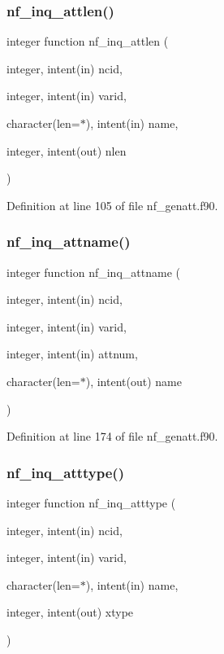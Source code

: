 \subsubsection{\texorpdfstring{nf\+\_\+inq\+\_\+attlen()}{nf\_inq\_attlen()}}
{\footnotesize\ttfamily integer function nf\+\_\+inq\+\_\+attlen (\begin{DoxyParamCaption}\item[{integer, intent(in)}]{ncid,  }\item[{integer, intent(in)}]{varid,  }\item[{character(len=$\ast$), intent(in)}]{name,  }\item[{integer, intent(out)}]{nlen }\end{DoxyParamCaption})}



Definition at line 105 of file nf\+\_\+genatt.\+f90.

\mbox{\label{nf__genatt_8f90_a87370c5fa098aaf289f0983582387921}} 
\subsubsection{\texorpdfstring{nf\+\_\+inq\+\_\+attname()}{nf\_inq\_attname()}}
{\footnotesize\ttfamily integer function nf\+\_\+inq\+\_\+attname (\begin{DoxyParamCaption}\item[{integer, intent(in)}]{ncid,  }\item[{integer, intent(in)}]{varid,  }\item[{integer, intent(in)}]{attnum,  }\item[{character(len=$\ast$), intent(out)}]{name }\end{DoxyParamCaption})}



Definition at line 174 of file nf\+\_\+genatt.\+f90.

\mbox{\label{nf__genatt_8f90_a91f4e37ce5ca9dd36e6d04e3c97ea245}} 
\subsubsection{\texorpdfstring{nf\+\_\+inq\+\_\+atttype()}{nf\_inq\_atttype()}}
{\footnotesize\ttfamily integer function nf\+\_\+inq\+\_\+atttype (\begin{DoxyParamCaption}\item[{integer, intent(in)}]{ncid,  }\item[{integer, intent(in)}]{varid,  }\item[{character(len=$\ast$), intent(in)}]{name,  }\item[{integer, intent(out)}]{xtype }\end{DoxyParamCaption})}



